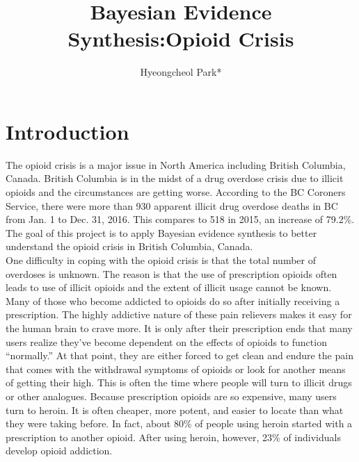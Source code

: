 \documentclass[12pt]{article}
\title{Bayesian Evidence Synthesis:Opioid Crisis}
\author{Hyeongcheol Park*}
\begin{document}
 \maketitle{}
\tableofcontents %
\listoffigures %
\listoftables %
\doublespacing

\begin{abstract}

\end{abstract}

\section{Introduction}
The opioid crisis is a major issue in North America including British Columbia, Canada. British Columbia is in the midst of a drug overdose crisis due to illicit opioids and the circumstances are getting worse. According to the BC Coroners Service, there were more than 930 apparent illicit drug overdose deaths in BC from Jan. 1 to Dec. 31, 2016. This compares to 518 in 2015, an increase of 79.2\%. \cite{bccdc_opioid}  The goal of this project is to apply Bayesian evidence synthesis to better understand the opioid crisis in British Columbia, Canada.  \\ 

One difficulty in coping with the opioid crisis is that the total number of overdoses is unknown. The reason is that the use of prescription opioids often leads to use of illicit opioids and the extent of illicit usage cannot be known. Many of those who become addicted to opioids do so after initially receiving a prescription. The highly addictive nature of these pain relievers makes it easy for the human brain to crave more. It is only after their prescription ends that many users realize they’ve become dependent on the effects of opioids  to function “normally.” At that point, they are either forced to get clean and endure the pain that comes with the withdrawal symptoms of opioids or look for another means of getting their high. This is often the time where people will turn to illicit drugs or other analogues. Because prescription opioids are so expensive,  many users turn to heroin. It is often cheaper, more potent, and easier to locate than what they were taking before. In fact, about 80\% of people using heroin started with a prescription to another opioid. After using heroin, however, 23\% of individuals develop opioid addiction.\cite{opioid_desc} \\
\end{document}
